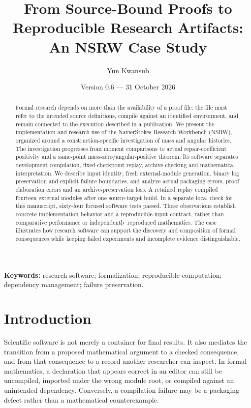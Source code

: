 \documentclass[11pt,a4paper]{article}
\author{Yun Kwansub}
\date{Version 0.6 --- 31 October 2026}
\title{From Source-Bound Proofs to Reproducible Research Artifacts: An NSRW Case Study}
\begin{document}
\maketitle
\begin{abstract}

Formal research depends on more than the availability of a proof file: the file must refer to the intended source definitions, compile against an identified environment, and remain connected to the execution described in a publication. We present the implementation and research use of the NavierStokes Research Workbench (NSRW), organized around a construction-specific investigation of mass and angular histories. The investigation progresses from moment comparisons to actual repair-coefficient positivity and a same-point mass-zero/angular-positive theorem. Its software separates development compilation, fixed-checkpoint replay, archive checking and mathematical interpretation. We describe input identity, fresh external-module generation, binary log preservation and explicit failure boundaries, and analyze actual packaging errors, proof elaboration errors and an archive-preservation loss. A retained replay compiled fourteen external modules after one source-target build. In a separate local check for this manuscript, sixty-four focused software tests passed. These observations establish concrete implementation behavior and a reproducible-input contract, rather than comparative performance or independently reproduced mathematics. The case illustrates how research software can support the discovery and composition of formal consequences while keeping failed experiments and incomplete evidence distinguishable.

\end{abstract}
\noindent \textbf{Keywords:} research software; formalization; reproducible computation; dependency management; failure preservation.

\section{Introduction}

Scientific software is not merely a container for final results. It also mediates the transition from a proposed mathematical argument to a checked consequence, and from that consequence to a record another researcher can inspect. In formal mathematics, a declaration that appears correct in an editor can still be uncompiled, imported under the wrong module root, or compiled against an unintended dependency. Conversely, a compilation failure may be a packaging defect rather than a mathematical counterexample.
\end{document}
